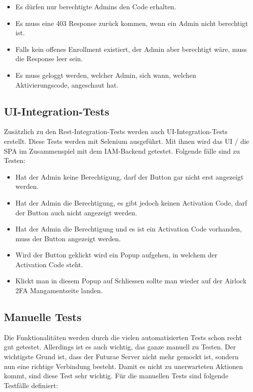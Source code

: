\begin{itemize}
	\item Es dürfen nur berechtigte Admins den Code erhalten.
	\item Es muss eine 403 Response zurück kommen, wenn ein Admin nicht berechtigt ist.
	\item Falls kein offenes Enrollment existiert, der Admin aber berechtigt wäre, muss die Response leer sein.
	\item Es muss geloggt werden, welcher Admin, sich wann, welchen Aktivierungscode, angeschaut hat.
\end{itemize}

\subsection{UI-Integration-Tests}
Zusätzlich zu den Rest-Integration-Tests werden auch UI-Integration-Tests erstellt. Diese Tests werden mit Selenium ausgeführt. Mit ihnen wird das UI / die SPA im Zusammenspiel mit dem IAM-Backend getestet.
Folgende fälle sind zu Testen:
\begin{itemize}
	\item Hat der Admin keine Berechtigung, darf der Button gar nicht erst angezeigt werden.
	\item Hat der Admin die Berechtigung, es gibt jedoch keinen Activation Code, darf der Button auch nicht angezeigt werden.
	\item Hat der Admin die Berechtigung und es ist ein Activation Code vorhanden, muss der Button angezeigt werden.
	\item Wird der Button geklickt wird ein Popup aufgehen, in welchem der Activation Code steht.
	\item Klickt man in diesem Popup auf Schliessen sollte man wieder auf der Airlock 2FA Mangamentseite landen.
\end{itemize}
\newpage

\subsection{Manuelle Tests}
Die Funktionalitäten werden durch die vielen automatisierten Tests schon recht gut getestet. Allerdings ist es auch wichtig, das ganze manuell zu Testen. Der wichtigste Grund ist, dass der Futurae Server nicht mehr gemockt ist, sondern nun eine richtige Verbindung besteht. Damit es nicht zu unerwarteten Aktionen kommt, sind diese Test sehr wichtig. Für die manuellen Tests sind folgende Testfälle definiert:

